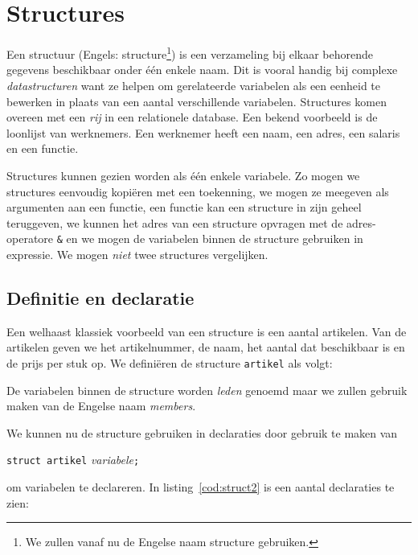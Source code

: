 \chapter{Structures}
\label{cha:structures}
\thispagestyle{empty}

Een structuur (Engels: structure\footnote{We zullen vanaf nu de Engelse naam structure gebruiken.}) is een verzameling bij elkaar behorende gegevens beschikbaar onder één enkele naam. Dit is vooral handig bij complexe \textsl{datastructuren} want ze helpen om gerelateerde variabelen als een eenheid te bewerken in plaats van een aantal verschillende variabelen. Structures komen overeen met een \textsl{rij} in een relationele database. Een bekend voorbeeld is de loonlijst van werknemers. Een werknemer heeft een naam, een adres, een salaris en een functie.

Structures kunnen gezien worden als één enkele variabele. Zo mogen we structures eenvoudig kopiëren met een toekenning, we mogen ze meegeven als argumenten aan een functie, een functie kan een structure in zijn geheel teruggeven, we kunnen het adres van een structure opvragen met de adres-operatore \texttt{\&} en we mogen de variabelen binnen de structure gebruiken in expressie. We mogen \textsl{niet} twee structures vergelijken.

\section{Definitie en declaratie}

Een welhaast klassiek voorbeeld van een structure is een aantal artikelen. Van de artikelen geven we het artikelnummer, de naam, het aantal dat beschikbaar is en de prijs per stuk op. We definiëren de structure \texttt{artikel} als volgt:


De variabelen binnen de structure worden \textsl{leden} genoemd maar we zullen gebruik maken van de Engelse naam \textsl{members}.

We kunnen nu de structure gebruiken in declaraties door gebruik te maken van

\hspace*{1em}\texttt{struct artikel} \textsl{variabele}\texttt{;}

om variabelen te declareren. In listing~\ref{cod:struct2} is een aantal declaraties te zien:

